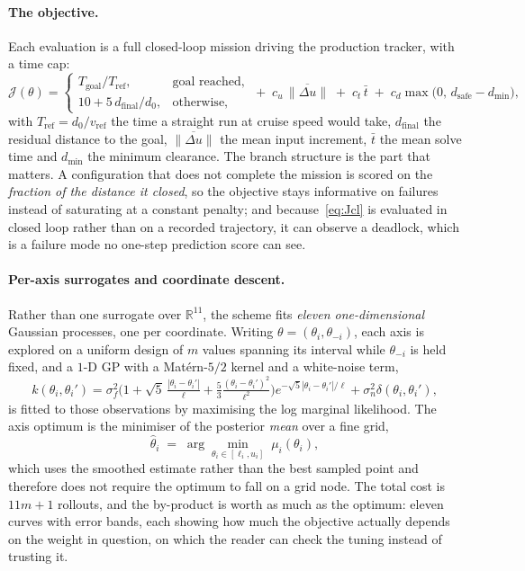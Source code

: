 \documentclass[11pt,a4paper]{article}
\newcommand{\R}{\mathbb{R}}
\newcommand{\dsafe}{d_{\mathrm{safe}}}
\begin{document}
\paragraph{The objective.} Each evaluation is a full closed-loop mission driving the production tracker, with
a time cap:
\begin{equation}
  \mathcal{J}(\theta)=
  \begin{cases}
    T_{\mathrm{goal}}/T_{\mathrm{ref}}, & \text{goal reached},\\[2pt]
    10+5\,d_{\mathrm{final}}/d_0, & \text{otherwise},
  \end{cases}
  \;+\;c_u\,\overline{\|\Delta u\|}\;+\;c_t\,\bar t\;+\;c_d\max\big(0,\,\dsafe-d_{\min}\big),
  \label{eq:Jcl}
\end{equation}
with $T_{\mathrm{ref}}=d_0/v_{\mathrm{ref}}$ the time a straight run at cruise speed would take,
$d_{\mathrm{final}}$ the residual distance to the goal, $\overline{\|\Delta u\|}$ the mean input increment,
$\bar t$ the mean solve time and $d_{\min}$ the minimum clearance. The branch structure is the part that
matters. A configuration that does not complete the mission is scored on the \emph{fraction of the distance
it closed}, so the objective stays informative on failures instead of saturating at a constant penalty; and
because~\eqref{eq:Jcl} is evaluated in closed loop rather than on a recorded trajectory, it can observe a
deadlock, which is a failure mode no one-step prediction score can see.

\paragraph{Per-axis surrogates and coordinate descent.} Rather than one surrogate over $\R^{11}$, the scheme
fits \emph{eleven one-dimensional} Gaussian processes, one per coordinate. Writing
$\theta=(\theta_i,\theta_{-i})$, each axis is explored on a uniform design of $m$ values spanning its
interval while $\theta_{-i}$ is held fixed, and a $1$-D GP with a Mat\'ern-$5/2$ kernel and a white-noise
term,
\begin{equation}
  k(\theta_i,\theta_i')=\sigma_f^2\Big(1+\sqrt5\,\tfrac{|\theta_i-\theta_i'|}{\ell}
  +\tfrac53\tfrac{(\theta_i-\theta_i')^2}{\ell^2}\Big)e^{-\sqrt5|\theta_i-\theta_i'|/\ell}
  +\sigma_n^2\delta(\theta_i,\theta_i'),
  \label{eq:kernel}
\end{equation}
is fitted to those observations by maximising the log marginal likelihood. The axis optimum is the minimiser
of the posterior \emph{mean} over a fine grid,
\begin{equation}
  \hat\theta_i \;=\; \arg\min_{\theta_i\in[\ell_i,u_i]}\; \mu_i(\theta_i),
  \label{eq:axisopt}
\end{equation}
which uses the smoothed estimate rather than the best sampled point and therefore does not require the
optimum to fall on a grid node. The total cost is $11m+1$ rollouts, and the by-product is worth as much as
the optimum: eleven curves with error bands, each showing how much the objective actually depends on the
weight in question, on which the reader can check the tuning instead of trusting it.
\end{document}
